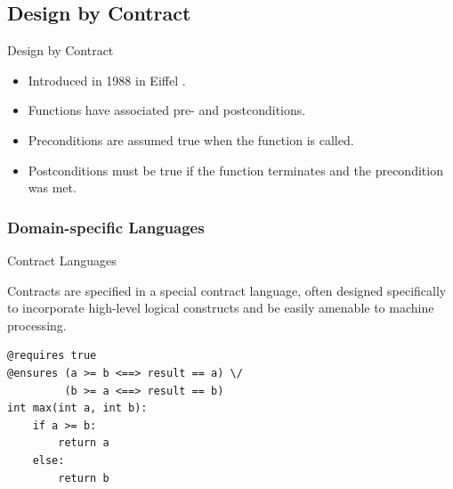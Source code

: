 \documentclass[12pt]{beamer}
\begin{document}

\subsection{Design by Contract}
\label{sec:runver-dbc}

\begin{frame}{Design by Contract}

  \begin{itemize}
    \item Introduced in 1988 in Eiffel \parencite{eiffel}.
    \item Functions have associated pre- and postconditions.
    \item Preconditions are assumed true when the function is called.
    \item Postconditions must be true if the function terminates
      and the precondition was met.
  \end{itemize}

\end{frame}

\subsubsection{Domain-specific Languages}
\label{sec:runver-dbc-ann}

\begin{frame}[fragile]{Contract Languages}

  Contracts are specified in a special contract language, often
  designed specifically to incorporate high-level logical constructs
  and be easily amenable to machine processing.

\begin{verbatim}
@requires true
@ensures (a >= b <==> result == a) \/
         (b >= a <==> result == b)
int max(int a, int b):
    if a >= b:
        return a
    else:
        return b
\end{verbatim}
\end{frame}
\end{document}

